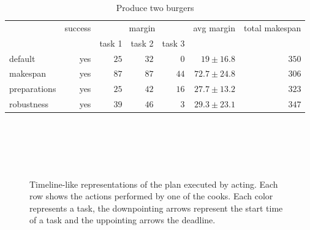 \begin{table}
  \centering
  \begin{tabular}{lrrrrrr}
                & success & \multicolumn{3}{c}{margin}  & avg margin     & total makespan  \\
                &         &  task 1 & task 2  & task 3  &                &  \\ \hline
  default       & yes     & $25$    & $32$    &  $0$    & $19\pm16.8$           & $350$     \\
  makespan      & yes     & $87$    & $87$    &  $44$   & $72.7\pm24.8$         & $306$       \\
  preparations  & yes     & $25$    & $42$    &  $16$   & $27.7\pm13.2$         & $323$    \\
  robustness    & yes     & $39$    & $46$    &  $3$    & $29.3\pm23.1$         & $347$ \\
  \end{tabular}
  \caption{Produce two burgers}
  \label{tab:eval-acting}
\end{table}



\begin{figure}
  \centering
   \\\medskip
   \\\medskip
   \\\medskip
   \\\medskip
  \caption[]{Timeline-like representations of the plan executed by acting. Each row shows the actions performed by one of the cooks. Each color represents a task, the downpointing arrows represent the start time of a task and the uppointing arrows the deadline.}
  \label{fig:eval-acting}
\end{figure}
